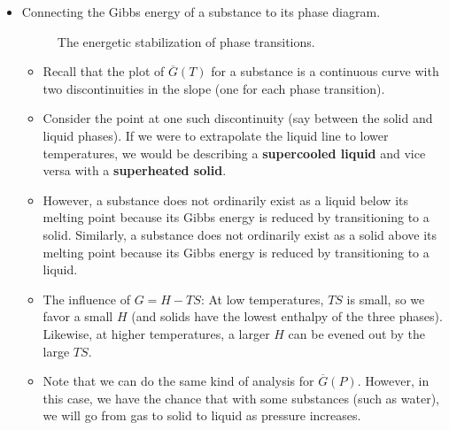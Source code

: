 \documentclass[../notes.tex]{subfiles}
\begin{document}
\begin{itemize}
    \item Connecting the Gibbs energy of a substance to its phase diagram.
    \begin{figure}[h!]
        \centering
        \caption{The energetic stabilization of phase transitions.}
        \label{fig:gibbsExtrapolation}
    \end{figure}
    \begin{itemize}
        \item Recall that the plot of $\overline{G}(T)$ for a substance is a continuous curve with two discontinuities in the slope (one for each phase transition).
        \item Consider the point at one such discontinuity (say between the solid and liquid phases). If we were to extrapolate the liquid line to lower temperatures, we would be describing a \textbf{supercooled liquid} and vice versa with a \textbf{superheated solid}.
        \item However, a substance does not ordinarily exist as a liquid below its melting point because its Gibbs energy is reduced by transitioning to a solid. Similarly, a substance does not ordinarily exist as a solid above its melting point because its Gibbs energy is reduced by transitioning to a liquid.
        \item The influence of $G=H-TS$: At low temperatures, $TS$ is small, so we favor a small $H$ (and solids have the lowest enthalpy of the three phases). Likewise, at higher temperatures, a larger $H$ can be evened out by the large $TS$.
        \item Note that we can do the same kind of analysis for $\overline{G}(P)$. However, in this case, we have the chance that with some substances (such as water), we will go from gas to solid to liquid as pressure increases.

\end{itemize}
\end{itemize}
\end{document}
